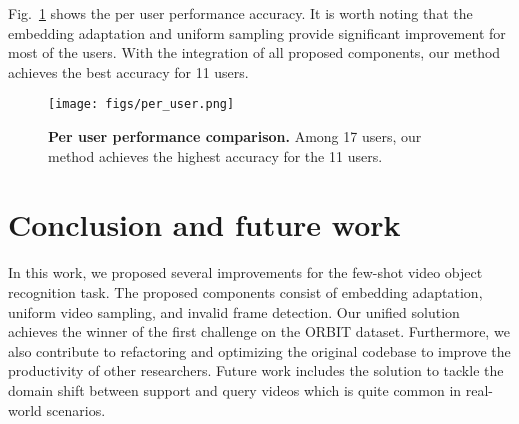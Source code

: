  Fig.~\ref{fig:per_user} shows the per user performance accuracy. It is worth noting that the embedding adaptation and uniform sampling provide significant improvement for most of the users. With the integration of all proposed components, our method achieves the best accuracy for 11 users.

\begin{figure}[t]
    \centering
    \texttt{[image: figs/per\_user.png]}
    \caption{\textbf{Per user performance comparison.} Among 17 users, our method achieves the highest accuracy for the 11 users.} 
    \label{fig:per_user}
\end{figure}

\section{Conclusion and future work}

In this work, we proposed several improvements for the few-shot video object recognition task. The proposed components consist of embedding adaptation, uniform video sampling, and invalid frame detection. Our unified solution achieves the winner of the first challenge on the ORBIT dataset. Furthermore, we also contribute to refactoring and optimizing the original codebase to improve the productivity of other researchers. Future work includes the solution to tackle the domain shift between support and query videos which is quite common in real-world scenarios. 